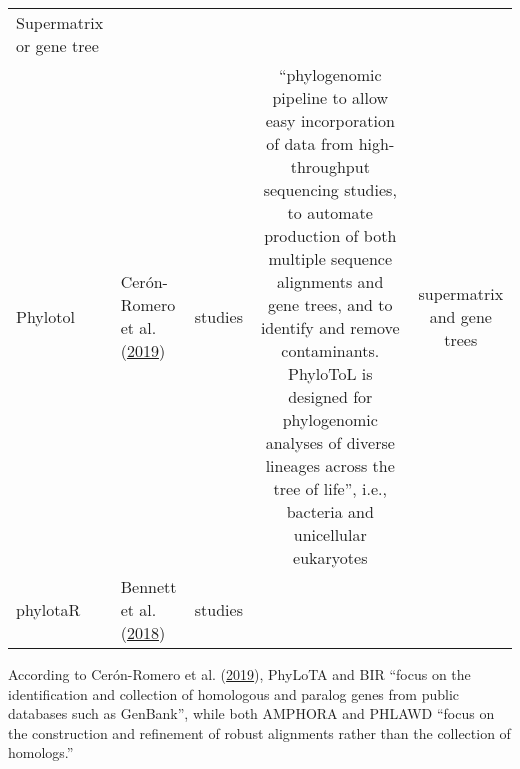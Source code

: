 \documentclass[]{article}
\begin{document}
\begin{longtable}[]{@{}llccc@{}}
\begin{minipage}[t]{0.20\columnwidth}
Supermatrix or gene tree\strut
\end{minipage}\tabularnewline
\begin{minipage}[t]{0.12\columnwidth}\raggedright
Phylotol\strut
\end{minipage} & \begin{minipage}[t]{0.15\columnwidth}\raggedright
Cerón-Romero et al. (\protect\hyperlink{ref-ceron2019phylotol}{2019})\strut
\end{minipage} & \begin{minipage}[t]{0.20\columnwidth}\centering
5 studies\strut
\end{minipage} & \begin{minipage}[t]{0.20\columnwidth}\centering
``phylogenomic pipeline to allow easy incorporation of data from high-throughput sequencing studies, to automate production of both multiple sequence alignments and gene trees, and to identify and remove contaminants. PhyloToL is designed for phylogenomic analyses of diverse lineages across the tree of life'', i.e., bacteria and unicellular eukaryotes\strut
\end{minipage} & \begin{minipage}[t]{0.20\columnwidth}\centering
supermatrix and gene trees\strut
\end{minipage}\tabularnewline
\begin{minipage}[t]{0.12\columnwidth}\raggedright
phylotaR\strut
\end{minipage} & \begin{minipage}[t]{0.15\columnwidth}\raggedright
Bennett et al. (\protect\hyperlink{ref-bennett2018phylotar}{2018})\strut
\end{minipage} & \begin{minipage}[t]{0.20\columnwidth}\centering
studies\strut
\end{minipage} & \begin{minipage}[t]{0.20\columnwidth}\centering
\strut
\end{minipage} & \begin{minipage}[t]{0.20\columnwidth}\centering
\strut
\end{minipage}\tabularnewline
\bottomrule
\end{longtable}

According to Cerón-Romero et al. (\protect\hyperlink{ref-ceron2019phylotol}{2019}), PhyLoTA and BIR ``focus on the identification and collection
of homologous and paralog genes from public databases such as GenBank'', while both AMPHORA and PHLAWD
``focus on the construction and refinement of robust alignments rather than the collection of homologs.''
\end{document}
